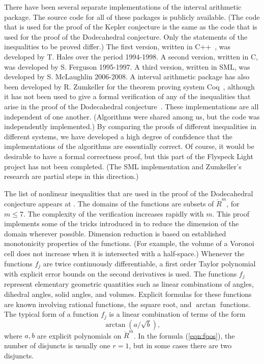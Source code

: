 \documentclass{article} %
\begin{document}
There have been several separate implementations of the interval
arithmetic package. The source code for all of these packages is
publicly available. (The code that is used for the proof of the Kepler
conjecture is the same as the code that is used for the proof of the
Dodecahedral conjecture. Only the statements of the inequalities to be
proved differ.) The first version, written in
C++~\cite{Stroustrup:1986:CPP}, was developed by T. Hales over the
period 1994-1998. A second version, written in C, was developed by S.
Ferguson 1995-1997. A third version, written in SML, was developed by
S. McLaughlin 2006-2008. A interval arithmetic package has also been
developed by R. Zumkeller for the theorem proving system
Coq~\cite{Bertot:2004:CoqBook}, although it has not been used to give
a formal verification of any of the inequalities that arise in the
proof of the Dodecahedral conjecture~\cite{Zumkeller:2008:Thesis}.
These implementations are all independent of one another. (Algorithms
were shared among us, but the code was independently implemented.) By
comparing the proofs of different inequalities in different systems,
we have developed a high degree of confidence that the implementations
of the algorithms are essentially correct. Of course, it would be
desirable to have a formal correctness proof, but this part of the
Flyspeck Light project has not been completed. (The SML implementation
and Zumkeller's research are partial steps in this direction.)

The list of nonlinear inequalities that are used in the proof of the
Dodecahedral conjecture appears at \cite{McLaughlin:2008:KeplerCode}.
The domains of the functions are subsets of $\ring{R}^m$, for $m\le
7$. The complexity of the verification increases rapidly with $m$.
This proof implements some of the tricks introduced in
\cite{Hales:2006:DCG} to reduce the dimension of the domain wherever
possible. Dimension reduction is based on established monotonicity
properties of the functions. (For example, the volume of a Voronoi
cell does not increase when it is intersected with a half-space.)
Whenever the functions $f_j$ are twice continuously differentiable, a
first order Taylor polynomial with explicit error bounds on the second
derivatives is used. The functions $f_j$ represent elementary
geometric quantities such as linear combinations of angles, dihedral
angles, solid angles, and volumes. Explicit formulas for these
functions are known involving rational functions, the square root, and
$\arctan$ functions. The typical form of a function $f_j$ is a linear
combination of terms of the form
$$
\arctan(a/\sqrt{b}),
$$
where $a,b$ are explicit polynomials on $\ring{R}^m$. In the formula
(\ref{eqn:fpos}), the number of disjuncts is usually one $r=1$, but in
some cases there are two disjuncts.
 
\end{document}
